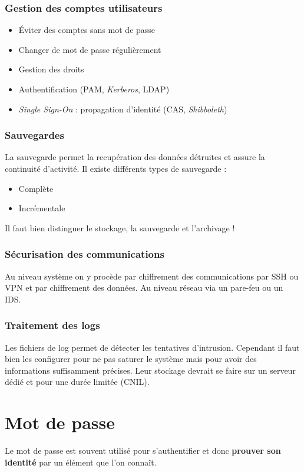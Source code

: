 \documentclass[12pt, a4paper]{article}
\begin{document}
	\subsubsection{Gestion des comptes utilisateurs}
	\begin{itemize}
		\item Éviter des comptes sans mot de passe
		\item Changer de mot de passe régulièrement
		\item Gestion des droits
		\item Authentification (PAM, \textit{Kerberos}, LDAP)
		\item \textit{Single Sign-On} : propagation d'identité (CAS,
		\textit{Shibboleth})
	\end{itemize}
	\subsubsection{Sauvegardes}
	La sauvegarde permet la recupération des données détruites et assure la
	continuité d'activité. Il existe différents types de sauvegarde :
	\begin{itemize}
		\item Complète
		\item Incrémentale
	\end{itemize}
	Il faut bien distinguer le stockage, la sauvegarde et l'archivage !
	\subsubsection{Sécurisation des communications}
	Au niveau système on y procède par chiffrement des communications par SSH ou
	VPN et par chiffrement des données. Au niveau réseau via un pare-feu ou un
	IDS.
	\subsubsection{Traitement des logs}
	Les fichiers de log permet de détecter les tentatives d'intrusion. Cependant
	il faut bien les configurer pour ne pas saturer le système mais pour avoir des
	 informations suffisamment précises. Leur stockage devrait se faire sur un
	serveur dédié et pour une durée limitée (CNIL).
	\section{Mot de passe}
	Le mot de passe est souvent utilisé pour s'authentifier et donc
	\textbf{prouver son identité} par un élément que l'on connaît.
\end{document}
